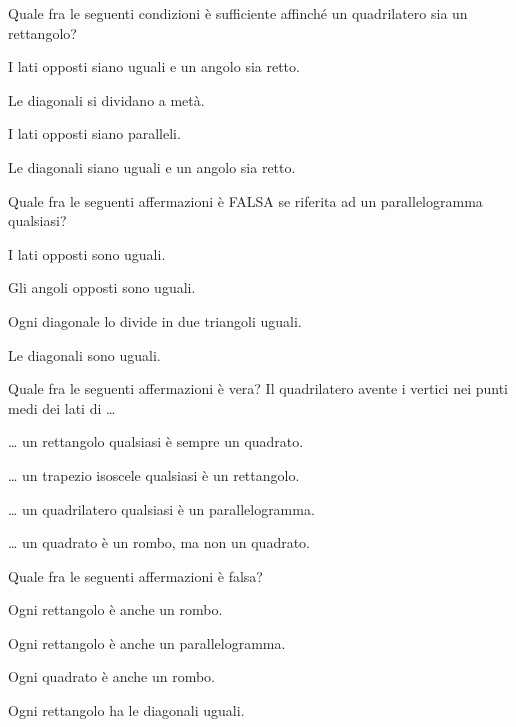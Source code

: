 \begin{esercizio}
\label{ese:4.64}
Quale fra le seguenti condizioni è sufficiente affinché un quadrilatero sia un rettangolo?
\begin{enumeratea}
\item I lati opposti siano uguali e un angolo sia retto.
\item Le diagonali si dividano a metà.
\item I lati opposti siano paralleli.
\item Le diagonali siano uguali e un angolo sia retto.
\end{enumeratea}
\end{esercizio}

\begin{esercizio}
\label{ese:4.65}
Quale fra le seguenti affermazioni è FALSA se riferita ad un parallelogramma qualsiasi?
\begin{enumeratea}
\item I lati opposti sono uguali.
\item Gli angoli opposti sono uguali.
\item Ogni diagonale lo divide in due triangoli uguali.
\item Le diagonali sono uguali.
\end{enumeratea}
\end{esercizio}

\begin{esercizio}
\label{ese:4.66}
Quale fra le seguenti affermazioni è vera?
Il quadrilatero avente i vertici nei punti medi dei lati di \ldots{}
\begin{enumeratea}
\item \ldots{} un rettangolo qualsiasi è sempre un quadrato.
\item \ldots{} un trapezio isoscele qualsiasi è un rettangolo.
\item \ldots{} un quadrilatero qualsiasi è un parallelogramma.
\item \ldots{} un quadrato è un rombo, ma non un quadrato.
\end{enumeratea}
\end{esercizio}

\begin{esercizio}
\label{ese:4.67}
Quale fra le seguenti affermazioni è falsa?
\begin{enumeratea}
\item Ogni rettangolo è anche un rombo.
\item Ogni rettangolo è anche un parallelogramma.
\item Ogni quadrato è anche un rombo.
\item Ogni rettangolo ha le diagonali uguali.
\end{enumeratea}
\end{esercizio}

